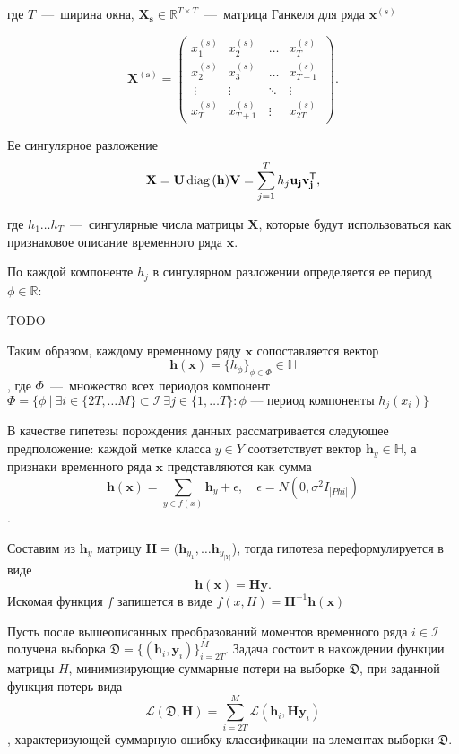 \documentclass[12pt, twoside]{article}
\begin{document}
где $T$~---~ширина окна, $\mathbf{X_s}\in \mathds{R}^{T\times T}$~---~матрица Ганкеля для ряда $\mathbf{x}^{(s)}$

\begin{equation*}
\mathbf{X^{(s)}} = \left(
\begin{array}{cccc}
x_1^{(s)} & x_2^{(s)} & \ldots & x_T^{(s)}\\
x_2^{(s)} & x_3^{(s)}\ & \ldots & x_{T+1}^{(s)}\\\
\vdots & \vdots & \ddots & \vdots\\
x_T^{(s)} & x_{T+1}^{(s)} & \vdots & x_{2T}^{(s)}\
\end{array}
\right).
\end{equation*}

Ее сингулярное разложение 
\begin{equation}\label{eq3}
\mathbf{X} = \mathbf{U}\diag{(\mathbf{h})}\mathbf{V} = \sum\limits_{j=1}^T h_j\mathbf{u_j}\mathbf{v_j^\mathsf{T}},
\end{equation}

где $h_1\ldots h_T$~---~сингулярные числа матрицы $\mathbf{X}$, которые будут использоваться как признаковое описание временного ряда $\mathbf{x}$.

По каждой компоненте $h_j$ в сингулярном разложении определяется ее период $\phi\in \mathds{R}$:

TODO

Таким образом, каждому временному ряду $\mathbf{x}$ сопоставляется вектор 
$$\mathbf{h(x)} = \{h_{\phi}\}_{\phi\in\Phi}\in \mathds{H}$$, где $\Phi$~---~множество всех периодов компонент $\Phi = \{\phi\ |\ \exists i \in \{2T,\ldots M\}\subset\mathcal{I}\ \exists j\in \{1,\ldots T\}: \phi \text{ --- период компоненты } h_j(x_i)\} $

В качестве гипетезы порождения данных рассматривается следующее предположение: каждой метке класса $y\in Y$ соответствует вектор $\mathbf{h}_y\in \mathds{H}$, а признаки временного ряда $\mathbf{x}$ представляются как сумма 
$$\mathbf{h(x)} = \sum\limits_{y\in f(x)}\mathbf{h}_y + \epsilon,\quad \epsilon = N(0, \sigma^2I_{|Phi|})$$. 

Составим из $\mathbf{h}_y$ матрицу $\mathbf{H} = (\mathbf{h}_{y_1},\ldots \mathbf{h}_{y_|Y|}$), тогда гипотеза переформулируется в виде 
$$\mathbf{h(x)} = \mathbf{H}\mathbf{y}.$$ Искомая функция $f$ запишется в виде $f(x, H) = \mathbf{H}^{-1}\mathbf{h(x)}$

Пусть после вышеописанных преобразований моментов временного ряда $i\in \mathcal{I}$ получена выборка $\mathfrak{D}=\{(\mathbf{h}_i,\mathbf{y}_i)\}_{i=2T}^{M}$. Задача состоит в нахождении функции матрицы $H$, минимизирующие суммарные потери на выборке $\mathfrak{D}$, при заданной функция потерь вида $$\mathscr{L}(\mathfrak{D}, \mathbf{H}) = \sum\limits_{i=2T}^M \mathscr{L}(\mathbf{h}_i, \mathbf{H}\mathbf{y}_i)$$, характеризующей суммарную ошибку классификации на элементах выборки $\mathfrak{D}$. 
\end{document}
